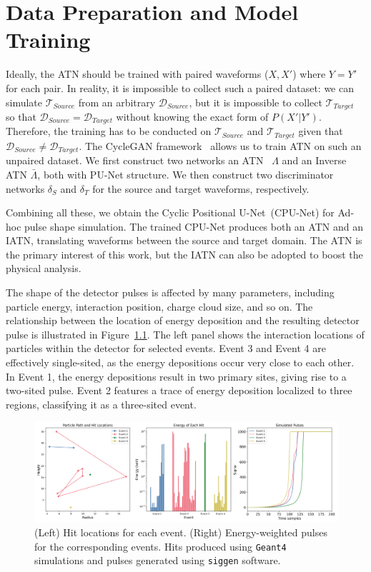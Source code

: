 \chapter{Data Preparation and Model Training}


Ideally, the ATN should be trained with paired waveforms ($X, X'$) where $Y=Y'$ for each pair. In reality, it is impossible to collect such a paired dataset: we can simulate $\mathcal{T}_{Source}$ from an arbitrary $\mathcal{D}_{Source}$, but it is impossible to collect $\mathcal{T}_{Target}$ so that $\mathcal{D}_{Source} = \mathcal{D}_{Target}$ without knowing the exact form of $P(X'|Y')$. Therefore, the training has to be conducted on $\mathcal{T}_{Source}$ and $\mathcal{T}_{Target}$ given that $\mathcal{D}_{Source} \neq \mathcal{D}_{Target}$. The CycleGAN framework~\cite{CycleGAN} allows us to train ATN on such an unpaired dataset. We first construct two networks an ATN~ $\Lambda$ and an Inverse ATN $\bar{\Lambda}$, both with PU-Net structure. We then construct two discriminator networks $\delta_{S}$ and $\delta_{T}$ for the source and target waveforms, respectively. 

Combining all these, we obtain the Cyclic Positional U-Net~(CPU-Net) for Ad-hoc pulse shape simulation. The trained CPU-Net produces both an ATN and an IATN, translating waveforms between the source and target domain. The ATN is the primary interest of this work, but the IATN can also be adopted to boost the physical analysis.


\label{chap:training}
The shape of the detector pulses is affected by many parameters, including particle energy, interaction position, charge cloud size, and so on. The relationship between the location of energy deposition and the resulting detector pulse is illustrated in Figure~\ref{fig:eng_dep_sim}. The left panel shows the interaction locations of particles within the detector for selected events. Event 3 and Event 4 are effectively single-sited, as the energy depositions occur very close to each other. In Event 1, the energy depositions result in two primary sites, giving rise to a two-sited pulse. Event 2 features a trace of energy deposition localized to three regions, classifying it as a three-sited event. 

\begin{figure}[htb!]
    \includegraphics[width=0.99\linewidth,trim={1pc 0pc 1pc 0pc},clip]{ch7/figs/hit_sims.png}
    \caption{(Left) Hit locations for each event. (Right) Energy-weighted pulses for the corresponding events. Hits produced using \texttt{Geant4} simulations and pulses generated using \texttt{siggen} software.}
   \label{fig:eng_dep_sim}
\end{figure}

